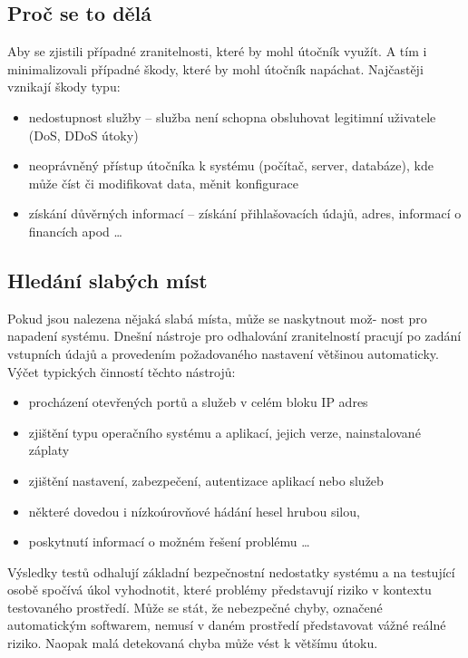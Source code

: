 \documentclass{article}
\begin{document}
\subsection{Proč se to dělá}Aby se zjistili případné zranitelnosti, které by mohl útočník využít. A tím i minimalizovali případné škody, které by mohl útočník napáchat. Najčastěji vznikají škody typu:
\begin{itemize}  
\item nedostupnost služby – služba není schopna obsluhovat legitimní uživatele (DoS,
DDoS útoky)
\item neoprávněný přístup útočníka k systému (počítač, server, databáze), kde může číst
či modifikovat data, měnit konfigurace
\item získání důvěrných informací – získání přihlašovacích údajů, adres, informací o financích
apod \ldots 
\end{itemize}

\subsection{Hledání slabých míst}
Pokud jsou nalezena nějaká slabá místa, může se naskytnout mož-
nost pro napadení systému. Dnešní nástroje pro odhalování zranitelností pracují po zadání
vstupních údajů a provedením požadovaného nastavení většinou automaticky. Výčet typických
činností těchto nástrojů:
\begin{itemize}  
\item procházení otevřených portů a služeb v celém bloku IP adres
\item zjištění typu operačního systému a aplikací, jejich verze, nainstalované záplaty
\item  zjištění nastavení, zabezpečení, autentizace aplikací nebo služeb
\item některé dovedou i nízkoúrovňové hádání hesel hrubou silou,
\item poskytnutí informací o možném řešení problému \ldots 
\end{itemize}
Výsledky testů odhalují základní bezpečnostní nedostatky systému a na testující osobě
spočívá úkol vyhodnotit, které problémy představují riziko v kontextu testovaného prostředí.
Může se stát, že nebezpečné chyby, označené automatickým softwarem, nemusí
v daném prostředí představovat vážné reálné riziko. Naopak malá detekovaná chyba může
vést k většímu útoku.
\end{document}
